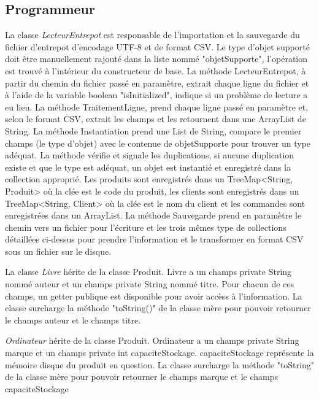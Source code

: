 \documentclass[11pt, french]{article} %
\begin{document}
\subsection{Programmeur}
La classe \textit{LecteurEntrepot} est responsable de l'importation et la sauvegarde du fichier d'entrepot d'encodage UTF-8 et de format CSV. Le type d'objet supporté doit être manuellement rajouté dans la liste nommé "objetSupporte", l'opération est trouvé à l'intérieur du constructeur de base. La méthode LecteurEntrepot, à partir du chemin du fichier passé en paramètre, extrait chaque ligne du fichier et à l'aide de la variable boolean "isInitialized", indique si un problème de lecture a eu lieu. La méthode TraitementLigne, prend chaque ligne passé en paramètre et, selon le format CSV, extrait les champs et les retournent dans une ArrayList de String. La méthode Instantiation prend une List de String, compare le premier champs (le type d'objet) avec le contenue de objetSupporte pour trouver un type adéquat. La méthode vérifie et signale les duplications, si aucune duplication existe et que le type est adéquat, un objet est instantié et enregistré dans la collection approprié. Les produits sont enregistrés dans un TreeMap<String, Produit> où la clée est le code du produit, les clients sont enregistrés dans un TreeMap<String, Client> où la clée est le nom du client et les commandes sont enregistrées dans un ArrayList. La méthode Sauvegarde prend en paramètre le chemin vers un fichier pour l'écriture et les trois mêmes type de collections détaillées ci-dessus pour prendre l'information et le transformer en format CSV sous un fichier sur le disque.
\newline

La classe \textit{Livre} hérite de la classe Produit. Livre a un champs private String nommé auteur et un champs private String nommé titre. Pour chacun de ces champs, un getter publique est disponible pour avoir accèss à l'information. La classe surcharge la méthode "toString()" de la classe mère pour pouvoir retourner le champs auteur et le champs titre.
\newline

\textit{Ordinateur} hérite de la classe Produit. Ordinateur a un champs private String marque et un champs private int capaciteStockage. capaciteStockage représente la mémoire disque du produit en question. La classe surcharge la méthode "toString" de la classe mère pour pouvoir retourner le champs marque et le champs capaciteStockage
\newline
\end{document}

